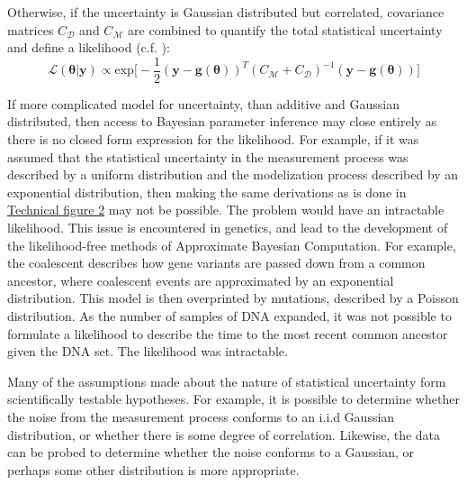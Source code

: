 Otherwise, if the uncertainty is Gaussian distributed but correlated, covariance matrices $C_{\mathcal{D}}$ and $C_{\mathcal{M}}$ are combined to quantify the total statistical uncertainty and define a likelihood (c.f. \citet[p.35-36]{Tarantola2005}):
\begin{equation}
\mathcal{L}(\bm{\theta}|\bm{y}) \propto \text{exp}\bigg[-\frac{1}{2}(\bm{y}-\bm{g}(\bm{\theta}))^T(C_{\mathcal{M}}+C_{\mathcal{D}})^{-1}(\bm{y}-\bm{g}(\bm{\theta}))\bigg]
\label{likelihood-2}
\end{equation}
\newpage

If more complicated model for uncertainty, than additive and Gaussian distributed, then access to Bayesian parameter inference may close entirely as there is no closed form expression for the likelihood. For example, if it was assumed that the statistical uncertainty in the measurement process was described by a uniform distribution and the modelization process described by an exponential distribution, then making the same derivations as is done in \hyperref[tf1]{Technical figure 2} may not be possible. The problem would have an intractable likelihood. This issue is encountered in genetics, and lead to the development of the likelihood-free methods of Approximate Bayesian Computation. For example, the coalescent \citep{Marjoram2006} describes how gene variants are passed down from a common ancestor, where coalescent events are approximated by an exponential distribution. This model is then overprinted by mutations, described by a Poisson distribution. As the number of samples of DNA expanded, it was not possible to formulate a likelihood to describe the time to the most recent common ancestor given the DNA set. The likelihood was intractable.\par



Many of the assumptions made about the nature of statistical uncertainty form scientifically testable hypotheses. For example, it is possible to determine whether the noise from the measurement process conforms to an i.i.d Gaussian distribution, or whether there is some degree of correlation. Likewise, the data can be probed to determine whether the noise conforms to a Gaussian, or perhaps some other distribution is more appropriate. \par

